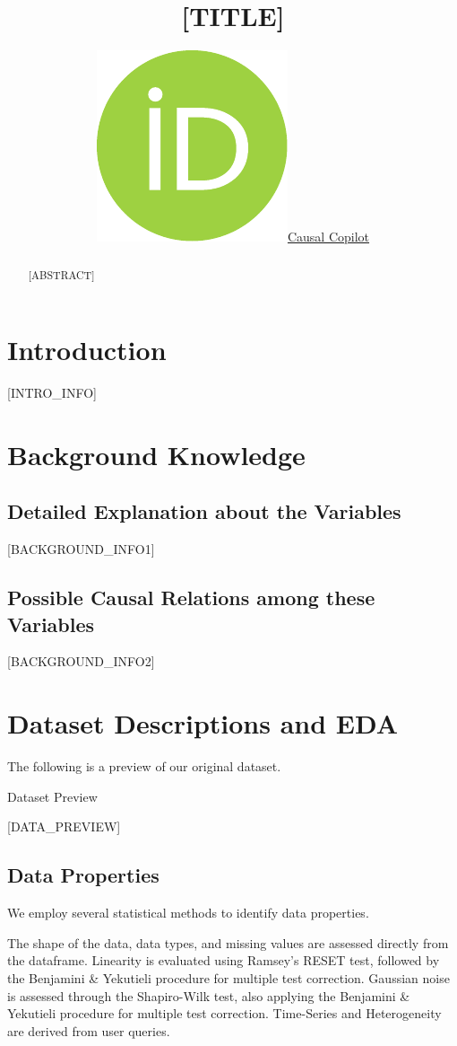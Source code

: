 \documentclass{article}
\title{[TITLE]}
\author{ \href{https://orcid.org/0000-0000-0000-0000}{\includegraphics[scale=0.06]{postprocess/context/orcid.pdf}\hspace{1mm}Causal Copilot}}
\begin{document}
\maketitle

\begin{abstract}
[ABSTRACT]
\end{abstract}


\raggedbottom
\section{Introduction}
[INTRO_INFO]

\section{Background Knowledge}
\subsection{Detailed Explanation about the Variables}
[BACKGROUND_INFO1]

\subsection{Possible Causal Relations among these Variables}

[BACKGROUND_INFO2]


\section{Dataset Descriptions and EDA}
The following is a preview of our original dataset.

\begin{table}[H]
    \centering
    \caption{Dataset Preview}
    [DATA_PREVIEW]
\end{table}

\subsection{Data Properties}
We employ several statistical methods to identify data properties.

The shape of the data, data types, and missing values are assessed directly from the dataframe.
Linearity is evaluated using Ramsey’s RESET test, followed by the Benjamini \& Yekutieli procedure for multiple test correction.
Gaussian noise is assessed through the Shapiro-Wilk test, also applying the Benjamini \& Yekutieli procedure for multiple test correction.
Time-Series and Heterogeneity are derived from user queries.
\end{document}
